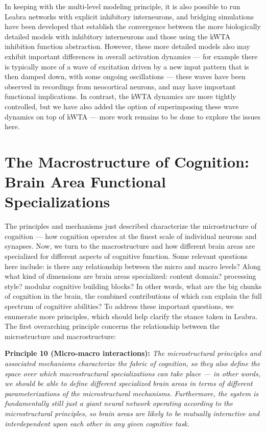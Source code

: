 \documentclass[11pt,twoside]{article}
\begin{document}
In keeping with the multi-level modeling principle, it is also possible to run Leabra networks with explicit inhibitory interneurons, and bridging simulations have been developed that establish the convergence between the more biologically detailed models with inhibitory interneurons and those using the kWTA inhibition function abstraction.  However, these more detailed models also may exhibit important differences in overall activation dynamics --- for example there is typically more of a wave of excitation driven by a new input pattern that is then damped down, with some ongoing oscillations --- these waves have been observed in recordings from neocortical neurons, and may have important functional implications.  In contrast, the kWTA dynamics are more tightly controlled, but we have also added the option of superimposing these wave dynamics on top of kWTA --- more work remains to be done to explore the issues here.


\section{The Macrostructure of Cognition: Brain Area Functional Specializations}

The principles and mechanisms just described characterize the microstructure of cognition --- how cognition operates at the finest scale of individual neurons and synapses.  Now, we turn to the macrostructure and how different brain areas are specialized for different aspects of cognitive function.  Some relevant questions here include: is there any relationship between the micro and macro levels?  Along what kind of dimensions are brain areas specialized: content domain?  processing style?  modular cognitive building blocks?  In other words, what are the big chunks of cognition in the brain, the combined contributions of which can explain the full spectrum of cognitive abilities?  To address these important questions, we enumerate more principles, which should help clarify the stance taken in Leabra.  The first overarching principle concerns the relationship between the microstructure and macrostructure:

{\bf Principle 10 (Micro-macro interactions):} {\em The microstructural principles and associated mechanisms characterize the fabric of cognition, so they also define the space over which macrostructural specializations can take place --- in other words, we should be able to define different specialized brain areas in terms of different parameterizations of the microstructural mechanisms.  Furthermore, the system is fundamentally still just a giant neural network operating according to the microstructural principles, so brain areas are likely to be mutually interactive and interdependent upon each other in any given cognitive task.}
\end{document}
